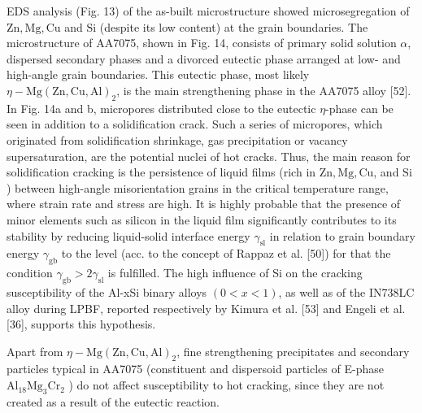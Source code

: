 \documentclass[10pt]{article}
\begin{document}
EDS analysis (Fig. 13) of the as-built microstructure showed microsegregation of $\mathrm{Zn}, \mathrm{Mg}, \mathrm{Cu}$ and $\mathrm{Si}$ (despite its low content) at the grain boundaries. The microstructure of AA7075, shown in Fig. 14, consists of primary solid solution $\alpha$, dispersed secondary phases and a divorced eutectic phase arranged at low- and high-angle grain boundaries. This eutectic phase, most likely $\eta-\mathrm{Mg}(\mathrm{Zn}, \mathrm{Cu}, \mathrm{Al})_{2}$, is the main strengthening phase in the AA7075 alloy [52]. In Fig. 14a and b, micropores distributed close to the eutectic $\eta$-phase can be seen in addition to a solidification crack. Such a series of micropores, which originated from solidification shrinkage, gas precipitation or vacancy supersaturation, are the potential nuclei of hot cracks. Thus, the main reason for solidification cracking is the persistence of liquid films (rich in $\mathrm{Zn}, \mathrm{Mg}, \mathrm{Cu}$, and $\mathrm{Si}$ ) between high-angle misorientation grains in the critical temperature range, where strain rate and stress are high. It is highly probable that the presence of minor elements such as silicon in the liquid film significantly contributes to its stability by reducing liquid-solid interface energy $\gamma_{\mathrm{sl}}$ in relation to grain boundary energy $\gamma_{\mathrm{gb}}$ to the level (acc. to the concept of Rappaz et al. [50]) for that the condition $\gamma_{\mathrm{gb}}>2 \gamma_{\mathrm{sl}}$ is fulfilled. The high influence of Si on the cracking susceptibility of the Al-xSi binary alloys $(0<x<1)$, as well as of the IN738LC alloy during LPBF, reported respectively by Kimura et al. [53] and Engeli et al. [36], supports this hypothesis.

Apart from $\eta-\mathrm{Mg}(\mathrm{Zn}, \mathrm{Cu}, \mathrm{Al})_{2}$, fine strengthening precipitates and secondary particles typical in AA7075 (constituent and dispersoid particles of E-phase $\mathrm{Al}_{18} \mathrm{Mg}_{3} \mathrm{Cr}_{2}$ ) do not affect susceptibility to hot cracking, since they are not created as a result of the eutectic reaction.
\end{document}
